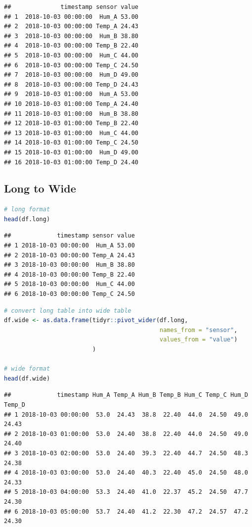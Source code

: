 \documentclass[
]{book}
\begin{document}
\begin{lstlisting}
##              timestamp sensor value
## 1  2018-10-03 00:00:00  Hum_A 53.00
## 2  2018-10-03 00:00:00 Temp_A 24.43
## 3  2018-10-03 00:00:00  Hum_B 38.80
## 4  2018-10-03 00:00:00 Temp_B 22.40
## 5  2018-10-03 00:00:00  Hum_C 44.00
## 6  2018-10-03 00:00:00 Temp_C 24.50
## 7  2018-10-03 00:00:00  Hum_D 49.00
## 8  2018-10-03 00:00:00 Temp_D 24.43
## 9  2018-10-03 01:00:00  Hum_A 53.00
## 10 2018-10-03 01:00:00 Temp_A 24.40
## 11 2018-10-03 01:00:00  Hum_B 38.80
## 12 2018-10-03 01:00:00 Temp_B 22.40
## 13 2018-10-03 01:00:00  Hum_C 44.00
## 14 2018-10-03 01:00:00 Temp_C 24.50
## 15 2018-10-03 01:00:00  Hum_D 49.00
## 16 2018-10-03 01:00:00 Temp_D 24.40
\end{lstlisting}

\hypertarget{long-to-wide}{%
\subsection{Long to Wide}\label{long-to-wide}}

\begin{lstlisting}[language=R]
# long format
head(df.long)
\end{lstlisting}

\begin{lstlisting}
##             timestamp sensor value
## 1 2018-10-03 00:00:00  Hum_A 53.00
## 2 2018-10-03 00:00:00 Temp_A 24.43
## 3 2018-10-03 00:00:00  Hum_B 38.80
## 4 2018-10-03 00:00:00 Temp_B 22.40
## 5 2018-10-03 00:00:00  Hum_C 44.00
## 6 2018-10-03 00:00:00 Temp_C 24.50
\end{lstlisting}

\begin{lstlisting}[language=R]
# convert long table into wide table
df.wide <- as.data.frame(tidyr::pivot_wider(df.long,
                                            names_from = "sensor",
                                            values_from = "value")
                         )

# wide format
head(df.wide)
\end{lstlisting}

\begin{lstlisting}
##             timestamp Hum_A Temp_A Hum_B Temp_B Hum_C Temp_C Hum_D Temp_D
## 1 2018-10-03 00:00:00  53.0  24.43  38.8  22.40  44.0  24.50  49.0  24.43
## 2 2018-10-03 01:00:00  53.0  24.40  38.8  22.40  44.0  24.50  49.0  24.40
## 3 2018-10-03 02:00:00  53.0  24.40  39.3  22.40  44.7  24.50  48.3  24.38
## 4 2018-10-03 03:00:00  53.0  24.40  40.3  22.40  45.0  24.50  48.0  24.33
## 5 2018-10-03 04:00:00  53.3  24.40  41.0  22.37  45.2  24.50  47.7  24.30
## 6 2018-10-03 05:00:00  53.7  24.40  41.2  22.30  47.2  24.57  47.2  24.30
\end{lstlisting}
\end{document}
